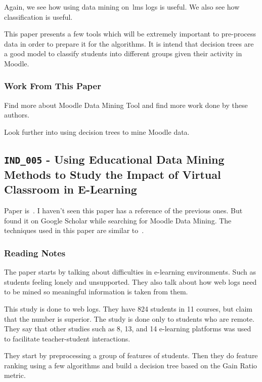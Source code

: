 Again, we see how using data mining on~\gls{lms} logs is useful. We also see
how classification is useful.

This paper presents a few tools which will be extremely important to
pre-process data in order to prepare it for the algorithms. It is intend that
decision trees are a good model to classify students into different groups
given their activity in Moodle.

\subsubsection{Work From This Paper}

Find more about Moodle Data Mining Tool and find more work done by these
authors.

Look further into using decision trees to mine Moodle data.

\subsection{\texttt{IND\_005} - Using Educational Data Mining Methods to Study the
Impact of Virtual Classroom in E-Learning}

Paper is~\cite{ind_005}. I haven't seen this paper has a reference of the
previous ones. But found it on Google Scholar while searching for Moodle Data
Mining. The techniques used in this paper are similar to~\cite{ind_002,
ind_004}.

\subsubsection{Reading Notes}

The paper starts by talking about difficulties in e-learning environments. Such
as students feeling lonely and unsupported. They also talk about how web logs
need to be mined so meaningful information is taken from them.

This study is done to web logs. They have 824 students in 11 courses, but claim
that the number is superior. The study is done only to students who are remote.
They say that other studies such as 8, 13, and 14 e-learning platforms was used
to facilitate teacher-student interactions.

They start by preprocessing a group of features of students. Then they do
feature ranking using a few algorithms and build a decision tree based on the
Gain Ratio metric.


